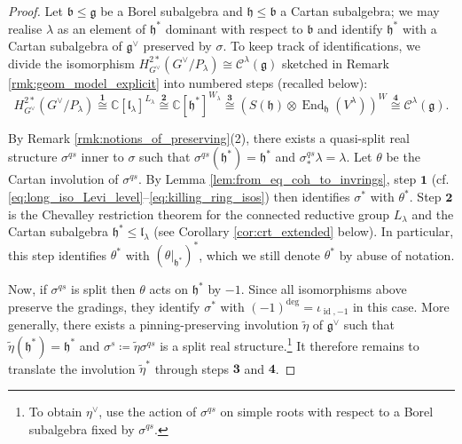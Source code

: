\documentclass{amsart}
\newcommand{\cf}{cf.\,}
\renewcommand{\b}{\mathfrak{b}}
\newcommand{\C}{\mathbb{C}}
\newcommand{\Kir}{\mathcal{C}}
\newcommand{\End}{\operatorname{End}}
\newcommand{\g}{\mathfrak{g}}
\newcommand{\h}{\mathfrak{h}}
\newcommand{\id}{\operatorname{id}}
\newcommand{\el}{\mathfrak{l}}
\theoremstyle{definition}
\theoremstyle{plain}
\theoremstyle{remark}
\begin{document}
\begin{proof}
    Let $\b\le \g$ be a Borel subalgebra and $\h\le \b$ a Cartan subalgebra; we may realise $\lambda$ as an element of $\h^*$ dominant with respect to $\b$ and identify $\h^*$ with a Cartan subalgebra of $\g^\vee$ preserved by $\sigma$.
    To keep track of identifications, we divide the isomorphism $H^{2*}_{G^\vee}(G^\vee/P_\lambda) \cong \Kir^\lambda(\g)$ sketched in Remark \ref{rmk:geom_model_explicit} into numbered steps (recalled below):
    $$
        H^{2*}_{G^\vee}(G^\vee/P_\lambda)
        \overset{\mathbf{1}}{\cong}
        \C[\el_\lambda]^{L_\lambda}
        \overset{\mathbf{2}}{\cong}
        \C[\h^*]^{W_\lambda}
        \overset{\mathbf{3}}{\cong}
        (S(\h) \otimes \End_\h(V^\lambda))^W
        \overset{\mathbf{4}}{\cong}
        \Kir^\lambda(\g).
    $$
    
    By Remark \ref{rmk:notions_of_preserving}(2), there exists a quasi-split real structure $\sigma^{qs}$ inner to $\sigma$ such that $\sigma^{qs}(\h^*) = \h^*$ and $\sigma^{qs}_*\lambda = \lambda$. Let $\theta$ be the Cartan involution of $\sigma^{qs}$. By Lemma \ref{lem:from_eq_coh_to_invrings}, step $\mathbf{1}$ (\cf \eqref{eq:long_iso_Levi_level}--\eqref{eq:killing_ring_isos}) then identifies $\sigma^*$ with $\theta^*$. Step $\mathbf{2}$ is the Chevalley restriction theorem for the connected reductive group $L_\lambda$ and the Cartan subalgebra $\h^*\le \el_\lambda$ (see Corollary \ref{cor:crt_extended} below). In particular, this step identifies $\theta^*$ with $(\theta|_{\h^*})^*$, which we still denote $\theta^*$ by abuse of notation. 

    Now, if $\sigma^{qs}$ is split then $\theta$ acts on $\h^*$ by $-1$. Since all isomorphisms above preserve the gradings, they identify $\sigma^*$ with $(-1)^{\deg} = \iota_{\id, -1}$ in this case. More generally, there exists a pinning-preserving involution $\widetilde{\eta}$ of $\g^\vee$ such that $\widetilde{\eta}(\h^*) = \h^*$ and $\sigma^s \coloneqq \widetilde{\eta}\sigma^{qs}$ is a split real structure.\footnote{To obtain $\eta^\vee$, use the action of $\sigma^{qs}$ on simple roots with respect to a Borel subalgebra fixed by $\sigma^{qs}$.} It therefore remains to translate the involution $\widetilde{\eta}^*$ through steps $\mathbf{3}$ and $\mathbf{4}$.


\end{proof}
\end{document}
